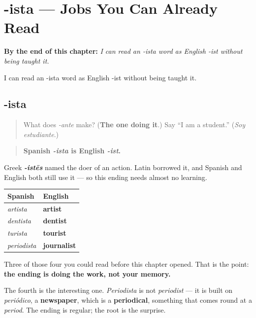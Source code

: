 
\chapter{-ista --- Jobs You Can Already Read}
\label{ch:ista}

\begin{chapteropening}
\textbf{By the end of this chapter:} \emph{I can read an -ista word as English -ist without being taught it.}

I can read an -ista word as English -ist without being taught it.
\end{chapteropening}

\section[-ista]{-ista}

\label{lesson:ES-C09-ista}



\begin{quote}
What does \emph{-ante} make? (\textbf{The one doing it}.) Say \textquotedblleft{}I am a student.\textquotedblright{} (\emph{Soy estudiante}.)
\end{quote}

\begin{grammarlens}[title={Grammar Lens: a job you can already read}]
\begin{quote}
\textbf{Spanish \emph{-ista} is English \emph{-ist}.}
\end{quote}

Greek \emph{\textbf{-istēs}} named the doer of an action. Latin borrowed it, and Spanish and English both still use it — so this ending needs almost no learning.

\noindent
\begin{tabularx}{\linewidth}{@{}>{\raggedright\arraybackslash}X>{\raggedright\arraybackslash}X@{}}
\toprule
\textbf{Spanish} & \textbf{English} \\
\midrule
\emph{artista} & \textbf{artist} \\
\emph{dentista} & \textbf{dentist} \\
\emph{turista} & \textbf{tourist} \\
\emph{periodista} & \textbf{journalist} \\
\bottomrule
\end{tabularx}

Three of those four you could read before this chapter opened. That is the point: \textbf{the ending is doing the work, not your memory.}

The fourth is the interesting one. \emph{Periodista} is not \emph{periodist} — it is built on \emph{periódico}, a \textbf{newspaper}, which is a \textbf{periodical}, something that comes round at a \emph{period}. The ending is regular; the root is the surprise.
\end{grammarlens}

